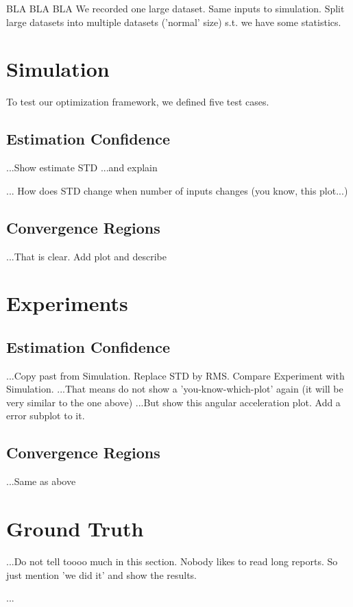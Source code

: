 BLA BLA BLA
We recorded one large dataset.
Same inputs to simulation.
Split large datasets into multiple datasets ('normal' size) s.t. we have some statistics.

\section{Simulation}
To test our optimization framework, we defined five test cases.
\subsection{Estimation Confidence}
...Show estimate STD
...and explain

... How does STD change when number of inputs changes (you know, this plot...)

\subsection{Convergence Regions}
...That is clear. Add plot and describe

\section{Experiments}
\subsection{Estimation Confidence}
...Copy past from Simulation. Replace STD by RMS. Compare Experiment with Simulation.
...That means do not show a 'you-know-which-plot' again (it will be very similar to the one above)
...But show this angular acceleration plot. Add a error subplot to it.
\subsection{Convergence Regions}
...Same as above
\section{Ground Truth}
...Do not tell toooo much in this section. Nobody likes to read long reports. So just mention 'we did it' and show the results.

...